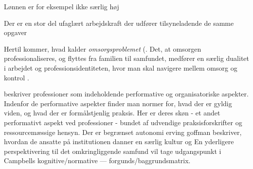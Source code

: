 Lønnen er for eksempel ikke særlig høj

Der er en stor del ufaglært arbejdskraft der udfører tilsyneladende de samme opgaver 


Hertil kommer, hvad \citeauthor{frederiksenVelfaerdsprofessionerMellemOmsorg2017} kalder \textit{omsorgsproblemet} (.
Det, at omsorgen professionaliseres, og flyttes fra familien til samfundet, medfører en særlig dualitet i arbejdet og professionsidentiteten, hvor man skal navigere mellem omsorg og kontrol \autocite[s. 461]{frederiksenVelfaerdsprofessionerMellemOmsorg2017}.

\citeauthor{molanderProfesjonsstudierIntroduksjon2008} beskriver professioner som indeholdende performative og organisatoriske aspekter.
Indenfor de performative aspekter finder man normer for, hvad der er gyldig viden, og hvad der er formålstjenlig praksis.
Her er deres skøn - et andet performativt aspekt ved professioner - bundet af udvendige praksisforskrifter og ressourcemæssige hensyn.
Der er begrænset autonomi
erving goffman beskriver, hvordan de ansatte på institutionen danner en særlig kultur og 
En yderligere perspektivering til det omkringliggende samfund 
vil tage udgangspunkt i Campbells kognitive/normative — forgunds/baggrundsmatrix.


